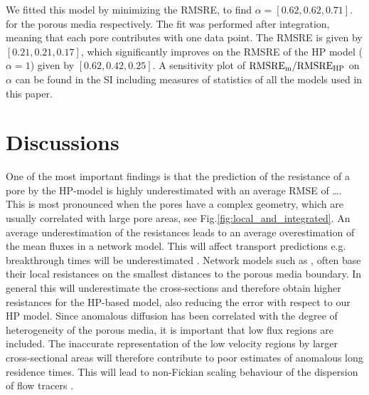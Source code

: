 \documentclass[draft]{agujournal2019}
\begin{document}
We fitted this model by minimizing the RMSRE, to find $\alpha =[0.62, 0.62, 0.71]$. for the porous media respectively. The fit was performed after integration, meaning that each pore contributes with one data point. The RMSRE is given by $[0.21,0.21,0.17]$, which significantly improves on the RMSRE of the HP model ($\alpha = 1$) given by $[0.62,0.42,0.25]$. A sensitivity plot of $\rm{RMSRE}_m/\rm{RMSRE}_{HP}$ on $\alpha$ can be found in the SI including measures of statistics of all the models used in this paper.





\section{Discussions}

One of the most important findings is that the prediction of the resistance of a pore by the HP-model is highly underestimated with an average RMSE of \ldots. This is most pronounced when the pores have a complex geometry, which are usually correlated with large pore areas, see Fig.\ref{fig:local_and_integrated}. An average underestimation of the resistances leads to an average overestimation of the mean fluxes in a network model. This will affect transport predictions e.g. breakthrough times will be underestimated \cite{dentz_mechanisms_2018}. Network models such as \cite{alim_local_2017}, often base their local resistances on the smallest distances to the porous media boundary. In general this will underestimate the cross-sections and therefore obtain higher resistances for the HP-based model, also reducing the error with respect to our HP model. Since anomalous diffusion has been correlated with the degree of heterogeneity of the porous media, it is important that low flux regions are included. The inaccurate representation of the low velocity regions by larger cross-sectional areas will therefore contribute to poor estimates of anomalous long residence times. This will lead to non-Fickian scaling behaviour of the dispersion of flow tracers \cite{dentz_mechanisms_2018,dentz_delay_2006}.
\end{document}
